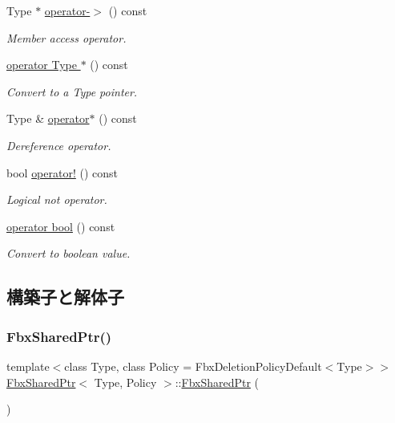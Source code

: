 \begin{DoxyCompactItemize}
Type $\ast$ \hyperlink{class_fbx_shared_ptr_ab52fbd8433b61e009074282c88814f7c}{operator-\/$>$} () const
\begin{DoxyCompactList}\small\item\em Member access operator. \end{DoxyCompactList}\item 
\hyperlink{class_fbx_shared_ptr_a4204201633921f32c564bd9329fe78fb}{operator Type $\ast$} () const
\begin{DoxyCompactList}\small\item\em Convert to a Type pointer. \end{DoxyCompactList}\item 
Type \& \hyperlink{class_fbx_shared_ptr_afc7cbb06097e354e016dbc58a2bd06a4}{operator$\ast$} () const
\begin{DoxyCompactList}\small\item\em Dereference operator. \end{DoxyCompactList}\item 
bool \hyperlink{class_fbx_shared_ptr_ac52a41b234d83cb8fa5deb75e740d950}{operator!} () const
\begin{DoxyCompactList}\small\item\em Logical not operator. \end{DoxyCompactList}\item 
\hyperlink{class_fbx_shared_ptr_a5e33203c68a6b6afe36eab50c491ff95}{operator bool} () const
\begin{DoxyCompactList}\small\item\em Convert to boolean value. \end{DoxyCompactList}\end{DoxyCompactItemize}


\subsection{構築子と解体子}
\mbox{\label{class_fbx_shared_ptr_a660b09efbcf67f747cb72163dccf1e11}} 
\subsubsection{\texorpdfstring{Fbx\+Shared\+Ptr()}{FbxSharedPtr()}\hspace{0.1cm}{\footnotesize\ttfamily [1/3]}}
{\footnotesize\ttfamily template$<$class Type, class Policy = Fbx\+Deletion\+Policy\+Default$<$\+Type$>$$>$ \\
\hyperlink{class_fbx_shared_ptr}{Fbx\+Shared\+Ptr}$<$ Type, Policy $>$\+::\hyperlink{class_fbx_shared_ptr}{Fbx\+Shared\+Ptr} (\begin{DoxyParamCaption}{ }\end{DoxyParamCaption})}

